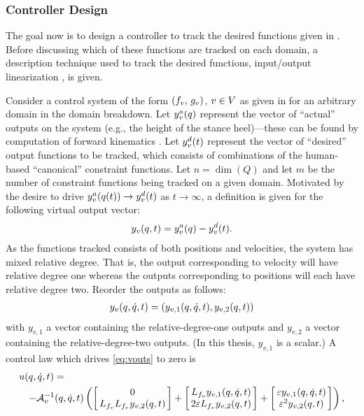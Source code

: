 \subsubsection{Controller Design}

The goal now is to design a controller to track the desired functions given in
.
%
Before discussing which of these functions are tracked on each domain, a
description technique used to track the desired functions, input/output
linearization \cite[Ch.~9]{Sastry1999}, is given. %

Consider a control system of the form $(f_{v}, \, g_{v})$, $v \in V$ as given in
 for an arbitrary domain in the domain breakdown.
%
Let $y^{a}_{v}(q)$ represent the vector of ``actual'' outputs on the system
(e.g., the height of the stance heel)---these can be found by computation of
forward kinematics \cite{Murray1994}.
%
Let $y^{d}_{v}(t)$ represent the vector of ``desired'' output functions to be
tracked, which consists of combinations of the human-based ``canonical''
constraint functions.
%
Let $n = \dim(Q)$ and let $m$ be the number of constraint functions being
tracked on a given domain.
%
Motivated by the desire to drive $y^{a}_{v}(q(t)) \to y^{d}_{v}(t)$ as $t
\to \infty$, a definition is given for the following virtual output vector:
%
\begin{align}
  \label{eq:virtout}
  y_v(q, t) = y^a_v(q) - y^d_v(t).
\end{align}
As the functions tracked consists of both positions and velocities, the system
has mixed relative degree.
%
That is, the output corresponding to velocity will have relative degree one
whereas the outputs corresponding to positions will each have relative degree
two.
%
Reorder the outputs as follows:
\begin{align}
  \label{eq:vouts}
  y_v(q, \dot{q}, t) = (y_{v,1}(q, \dot{q}, t), y_{v,2}(q, t))
\end{align}
with $y_{v,1}$ a vector containing the relative-degree-one outputs and $y_{v,2}$
a vector containing the relative-degree-two outputs.
%
(In this thesis, $y_{v,1}$ is a scalar.)
%
A control law which drives \eqref{eq:vouts} to zero is
\begin{align*}
  \lefteqn{u(\q, \dq, t) = }\\
  &&-\mathcal{A}_{v}^{-1}(\q, \dq, t)
  \left(\left[\!\!\begin{array}{c}
      0\\
      L_{\xfv} L_{\xfv} y_{v,2}(\q, t)
    \end{array}\!\!\right]
  + \left[\!\!\begin{array}{c}
      L_{\xfv} y_{v,1}(\q, \dq, t)\\
      2 \varepsilon L_{\xfv} y_{v,2}(\q, t)
    \end{array}\!\!\right] +
  \left[\!\!\begin{array}{c}
      \varepsilon y_{v,1}(\q, \dq, t)\\
      \varepsilon^2 y_{v,2}(\q, t)
    \end{array}\!\!\right]\right),
\end{align*}
